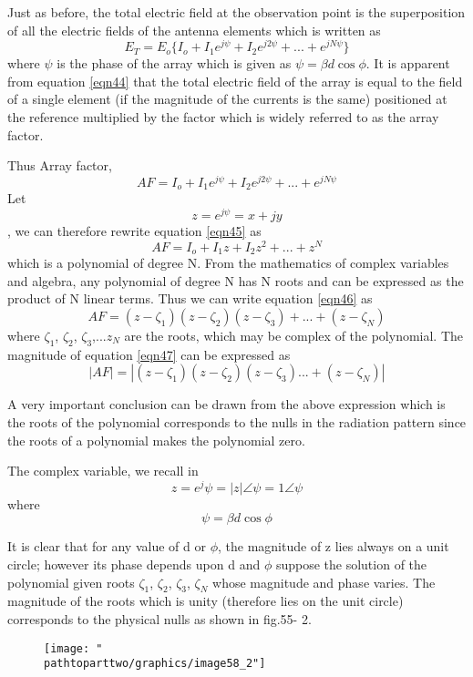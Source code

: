 Just as before, the total electric field at the observation point is the superposition of all the electric fields of the antenna elements which is written as 
\begin{equation}
E_{T}=E_{o}\{I_{o}+I_{1}e^{j\psi}+I_{2}e^{j2\psi}+...+e^{jN\psi}\}
\label{eqn44}
\end{equation}
where $\psi$ is the phase of the array which is given as $\psi=\beta d\cos\phi$. It is apparent from equation \ref{eqn44} that the total electric field of the array is equal to the field of a single element (if the magnitude of the currents is the same) positioned at the reference multiplied by the factor which is widely referred to as the array factor. 

Thus Array factor,
\begin{equation}
AF=I_{o}+I_{1}e^{j\psi}+I_{2}e^{j2\psi}+...+e^{jN\psi}
\label{eqn45}
\end{equation}
 Let $$z=e^{j\psi}=x+jy$$, we can therefore rewrite equation \ref{eqn45} as
\begin{equation}
AF=I_{o}+I_{1}z+I_{2}z^{2}+...+z^N
\label{eqn46}
\end{equation}
which is a polynomial of degree N. From the mathematics of complex variables and algebra, any polynomial of degree N has N roots and can be expressed as the product of N linear terms. Thus we can write equation \ref{eqn46} as 
\begin{equation}
AF=(z-\zeta_1)(z-\zeta_2)(z-\zeta_3)+...+(z-\zeta_N)
\label{eqn47}
\end{equation}
where $\zeta_{1}$, $\zeta_{2}$, $\zeta_{3}$,...$z_{N}$ are the roots, which may be complex of the polynomial. The magnitude of equation \ref{eqn47} can be expressed as
\begin{equation}
|AF|=|(z-\zeta_1)(z-\zeta_2)(z-\zeta_3)...+(z-\zeta_N)|
\label{eqn48}
\end{equation}

A very important conclusion can be drawn from the above expression which is the roots of the polynomial corresponds to the nulls in the radiation pattern since the roots of a polynomial makes the polynomial zero.

The complex variable, we recall in 
$$z=e^j{\psi}=|z|\angle\psi = 1\angle\psi$$
where $$\psi=\beta d\cos\phi$$

It is clear that for any value of d or $\phi$, the magnitude of z lies always on a unit circle; however its phase depends upon d and $\phi$ suppose the solution of the polynomial given roots $\zeta_{1}$, $\zeta_{2}$, $\zeta_{3}$, $\zeta_{N}$ whose magnitude and phase varies. The magnitude of the roots which is unity (therefore lies on the unit circle) corresponds to the physical nulls as shown in fig.55- 2.
\begin{figure}[h]
\centering
\texttt{[image: "\\pathtoparttwo/graphics/image58\_2"]}
\caption{}
\label{fig:fig 55_2}
\end{figure}

